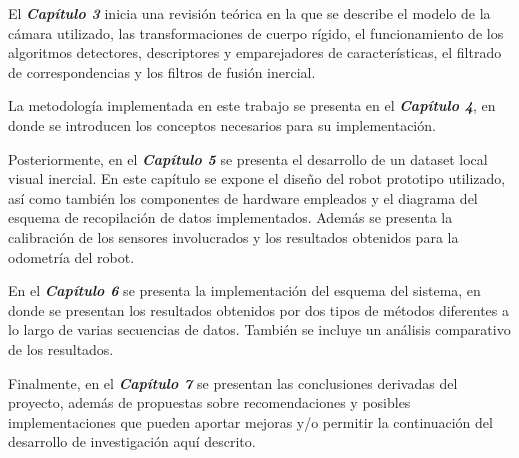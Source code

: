 El \textit{\textbf{Capítulo 3}} inicia una revisión teórica en la que se describe el modelo de la cámara utilizado, las transformaciones de cuerpo rígido, 
el funcionamiento de los algoritmos detectores, descriptores y emparejadores de características, el filtrado de correspondencias y los filtros de fusión inercial.

La metodología implementada en este trabajo se presenta en el \textit{\textbf{Capítulo 4}}, en donde se introducen los conceptos necesarios para su implementación.

Posteriormente, en el \textit{\textbf{Capítulo 5}} se presenta el desarrollo de un dataset local visual inercial. En este capítulo se expone el diseño del robot prototipo utilizado, así como también los componentes de hardware empleados y el diagrama del esquema de recopilación de datos implementados. Además se presenta la calibración de los sensores involucrados y los resultados obtenidos para la odometría del robot.

En el \textit{\textbf{Capítulo 6}} se presenta la implementación del esquema del sistema, en donde se presentan los resultados obtenidos por dos tipos de métodos diferentes a lo largo de varias secuencias de datos. También se incluye un análisis comparativo de los resultados.


Finalmente, en el \textit{\textbf{Capítulo 7}} se presentan las conclusiones derivadas del proyecto, además de propuestas sobre recomendaciones y posibles implementaciones que pueden aportar mejoras y/o permitir la continuación del desarrollo de investigación aquí descrito.
